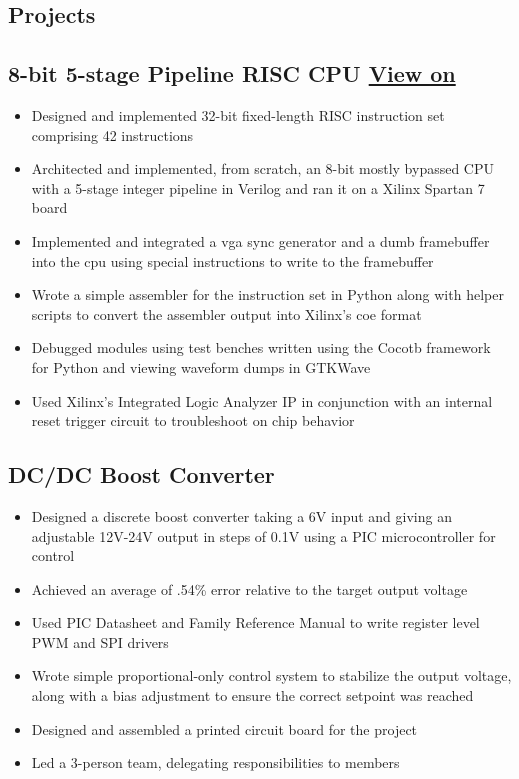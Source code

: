 \documentclass{article}
\begin{document}
\begin{spacing}{.5}
\section{Projects}
	\subsection{8-bit 5-stage Pipeline RISC CPU \hspace{.1cm} \href{https://github.com/ZachWWalden/HdlMicroProcessor}{View on \faGithub} \hfill {}}
		\begin{itemize}[label=--,itemsep=-.35ex]
			\item \large{Designed and implemented 32-bit fixed-length RISC instruction set comprising 42 instructions}
			\item \large{Architected and implemented, from scratch, an 8-bit mostly bypassed CPU with a 5-stage integer pipeline in Verilog and ran it on a Xilinx Spartan 7 board}
			\item \large{Implemented and integrated a vga sync generator and a dumb framebuffer into the cpu using special instructions to write to the framebuffer}
			\item \large{Wrote a simple assembler for the instruction set in Python along with helper scripts to convert the assembler output into Xilinx's coe format}
			\item \large{Debugged modules using test benches written using the Cocotb framework for Python and viewing waveform dumps in GTKWave}
			\item \large{Used Xilinx's Integrated Logic Analyzer IP in conjunction with an internal reset trigger circuit to troubleshoot on chip behavior}
		\end{itemize}
	\subsection{DC/DC Boost Converter \hfill {}}
		\begin{itemize}[label=--,itemsep=-.35ex]
			\item \large{Designed a discrete boost converter taking a 6V input and giving an adjustable 12V-24V output in steps of 0.1V using a PIC microcontroller for control}
			\item \large{Achieved an average of .54\% error relative to the target output voltage}
			\item \large{Used PIC Datasheet and Family Reference Manual to write register level PWM and SPI drivers}
			\item \large{Wrote simple proportional-only control system to stabilize the output voltage, along with a bias adjustment to ensure the correct setpoint was reached}
			\item \large{Designed and assembled a printed circuit board for the project}
			\item \large{Led a 3-person team, delegating responsibilities to members}
		\end{itemize}
\begin{comment}

\end{comment}
\end{spacing}
\end{document}
